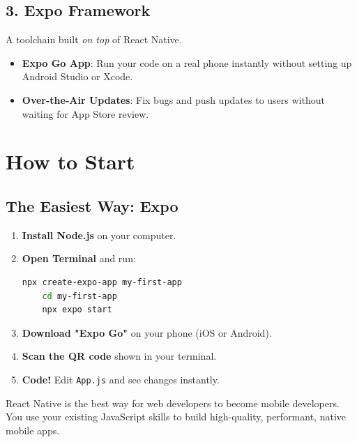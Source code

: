 \documentclass[11pt,a4paper,oneside]{book}
\begin{document}
\section{3. Expo Framework}
A toolchain built \textit{on top} of React Native.
\begin{itemize}
    \item \textbf{Expo Go App}: Run your code on a real phone instantly without setting up Android Studio or Xcode.
    \item \textbf{Over-the-Air Updates}: Fix bugs and push updates to users without waiting for App Store review.
\end{itemize}

\chapter{How to Start}

\section{The Easiest Way: Expo}

\begin{enumerate}
    \item \textbf{Install Node.js} on your computer.
    \item \textbf{Open Terminal} and run:
    \begin{lstlisting}[language=bash]
    npx create-expo-app my-first-app
    cd my-first-app
    npx expo start
    \end{lstlisting}
    \item \textbf{Download "Expo Go"} on your phone (iOS or Android).
    \item \textbf{Scan the QR code} shown in your terminal.
    \item \textbf{Code!} Edit \texttt{App.js} and see changes instantly.
\end{enumerate}

\begin{tcolorbox}[colback=green!10, colframe=green!70!black, title=Summary]
React Native is the best way for web developers to become mobile developers. You use your existing JavaScript skills to build high-quality, performant, native mobile apps.
\end{tcolorbox}
\end{document}
